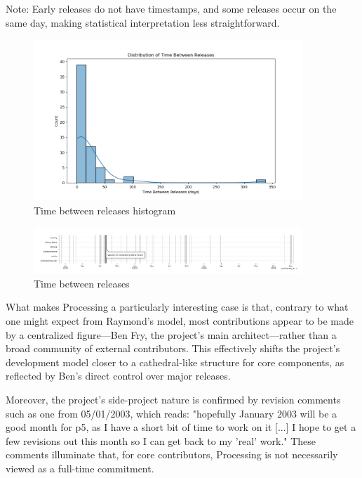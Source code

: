 \documentclass[draft]{article}
\begin{document}
Note: Early releases do not have timestamps, and some releases occur on the same day, making statistical interpretation less straightforward.

\begin{figure}[h!] 
  \centering
  \includegraphics[width=0.9\textwidth]{images/time_between_releases_histogram.png} 
  \caption{Time between releases histogram}
  \label{fig:releases_frequency_histogram}
\end{figure}

\begin{figure}[h!] 
  \centering
  \includegraphics[width=0.9\textwidth]{images/releases-lines.png} 
  \caption{Time between releases}
  \label{fig:releases-lines}
\end{figure}

What makes Processing a particularly interesting case is that, contrary to what one might expect from Raymond's model, most contributions appear to be made by a centralized figure—Ben Fry, the project's main architect—rather than a broad community of external contributors. This effectively shifts the project's development model closer to a cathedral-like structure for core components, as reflected by Ben's direct control over major releases. 

Moreover, the project’s side-project nature is confirmed by revision comments such as one from 05/01/2003, which reads: "hopefully January 2003 will be a good month for p5, as I have a short bit of time to work on it [...] I hope to get a few revisions out this month so I can get back to my 'real' work." These comments illuminate that, for core contributors, Processing is not necessarily viewed as a full-time commitment.
\end{document}
